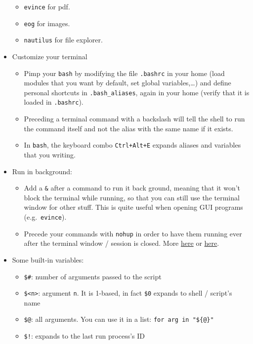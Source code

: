 \documentclass[a4paper,12pt,%
              final%
              ]{article}
\begin{document}
\begin{itemize}
\begin{itemize}
      \item \texttt{evince} for pdf.
      \item \texttt{eog} for images.
      \item \texttt{nautilus} for file explorer.
    \end{itemize}
  \item Customize your terminal
    \begin{itemize}
      \item Pimp your \texttt{bash} by modifying the file \texttt{.bashrc} in your home (load modules that you want by default, set global variables,\ldots) and define personal shortcuts in \texttt{.bash\_aliases}, again in your home (verify that it is loaded in \texttt{.bashrc}).
      \item Preceding a terminal command with a backslash will tell the shell to run the command itself and not the alias with the same name if it exists.
      \item In \texttt{bash}, the keyboard combo \texttt{Ctrl+Alt+E} expands aliases and variables that you writing.
    \end{itemize}
  \item Run in background:
    \begin{itemize}
      \item Add a \verb|&| after a command to run it back ground, meaning that it won't block the terminal while running, so that you can still use the terminal window for other stuff. This is quite useful when opening GUI programs (e.g.\ \texttt{evince}).
      \item Precede your commands with \texttt{nohup} in order to have them running ever after the terminal window / session is closed. More \href{https://linux.101hacks.com/unix/nohup-command/}{here} or \href{https://hexadix.com/use-nohup-execute-commands-background-keep-running-exit-shell-promt/}{here}.
    \end{itemize}
  \item Some built-in variables:
    \begin{itemize}
      \item \verb|$#|: number of arguments passed to the script
      \item \verb|$<n>|: argument \texttt{n}. It is 1-based, in fact \verb|$0| expands to shell / script's name
      \item \verb|$@|: all arguments. You can use it in a list: \verb|for arg in "${@}"|
      \item \verb|$!|: expands to the last run process's ID

\end{itemize}
\end{itemize}
\end{document}
